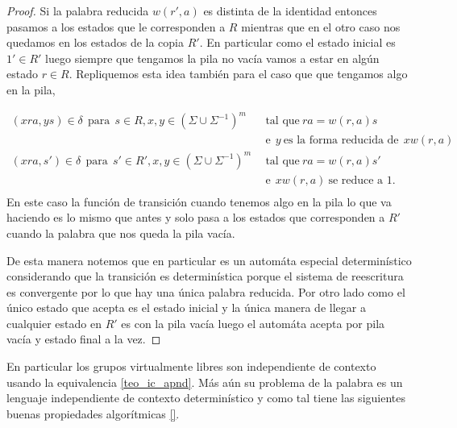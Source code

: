 \documentclass[tesis.tex]{subfiles}
\newcommand{\ic}{independiente de contexto }
\begin{document}
\begin{proof}
Si la palabra reducida $w(r',a)$ es distinta de la identidad entonces pasamos a los estados que le corresponden a $R$ mientras que en el otro caso nos quedamos en los estados de la copia $R'$. 
En particular como el estado inicial es $1' \in R'$ luego siempre que tengamos la pila no vacía vamos a estar en algún estado $r \in R$. 
Repliquemos esta idea también para el caso que que tengamos algo en la pila,
	
	\begin{align*}
	(xra,ys) \in \delta \ \ \text{para} \ \  s \in R, x,y \in (\Sigma \cup \Sigma^{-1})^m & \ \  \text{tal que} \ ra=w(r,a)s  \\ & \ \ \text{e} \ \ y \ \text{es la forma reducida de} \ \ xw(r,a)  \\
	(xra,s') \in \delta\ \ \text{para} \ \  s' \in R', x,y \in (\Sigma \cup \Sigma^{-1})^m & \ \  \text{tal que} \ ra=w(r,a)s'  \\ & \ \ \text{e}  \ \ xw(r,a)  \ \text{se reduce a 1}. \ \  \\ 
	\end{align*}
	En este caso la función de transición cuando tenemos algo en la pila lo que va haciendo es lo mismo que antes y solo pasa a los estados que corresponden a $R'$ cuando la palabra que nos queda la pila vacía. 
	
	De esta manera notemos que en particular es un automáta especial determinístico considerando que la transición es determinística porque el sistema de reescritura es convergente por lo que hay una única palabra reducida. 
	Por otro lado como el único estado que acepta es el estado inicial y la única manera de llegar a cualquier estado en $R'$ es con la pila vacía luego el automáta acepta por pila vacía y estado final a la vez.
\end{proof}

\begin{obs}
	En particular los grupos virtualmente libres son \ic usando la equivalencia \ref{teo_ic_apnd}. 
	Más aún su problema de la palabra es un lenguaje independiente de contexto determinístico y como tal tiene las siguientes buenas propiedades algorítmicas \ref{}.
\end{obs}
\end{document}
